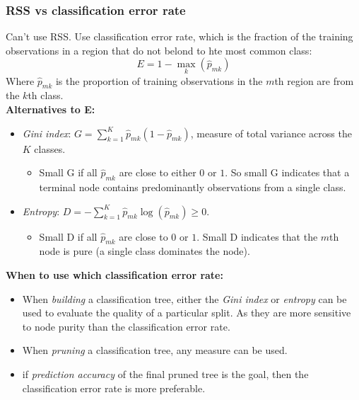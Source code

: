 \documentclass[11pt]{article}
\begin{document}
\subsubsection{RSS vs classification error rate}
\noindent Can't use RSS. Use classification error rate, which is the fraction of the training observations in a region that do not belond to hte most common class:
$$E = 1 - \max_{k}{(\hat{p}_{mk})}$$
\noindent Where $\hat{p}_{mk}$ is the proportion of training observations in the $m$th region are from the $k$th class. \\

\noindent \textbf{Alternatives to E:} \\
\begin{itemize}
    \item \textit{Gini index}: $G = \sum_{k=1}^{K}{\hat{p}_{mk}(1-\hat{p}_{mk})}$, measure of total variance across the $K$ classes.
        \begin{itemize}
            \item Small G if all $\hat{p}_{mk}$ are close to either $0$ or $1$. So small G indicates that a terminal node contains predominantly observations from a single class.
        \end{itemize}
    \item \textit{Entropy}: $D = -\sum_{k=1}^{K}{\hat{p}_{mk}\log(\hat{p}_{mk})} \geq 0$.
        \begin{itemize}
            \item Small D if all $\hat{p}_{mk}$ are close to $0$ or $1$. Small D indicates that the $m$th node is pure (a single class dominates the node).
        \end{itemize}
\end{itemize} \phantom{i}

\noindent \textbf{When to use which classification error rate:}
\begin{itemize}
    \item When \textit{building} a classification tree, either the \textit{Gini index} or \textit{entropy} can be used to evaluate the quality of a particular split. As they are more sensitive to node purity than the classification error rate.
    \item When \textit{pruning} a classification tree, any measure can be used.
    \item if \textit{prediction accuracy} of the final pruned tree is the goal, then the classification error rate is more preferable.
\end{itemize}
\end{document}
